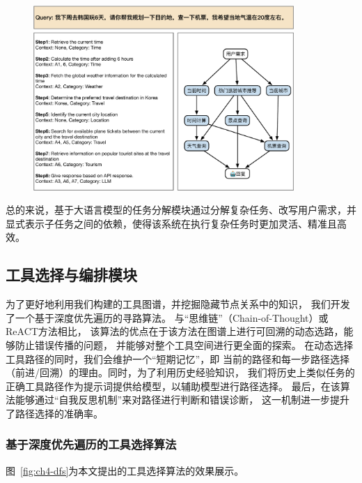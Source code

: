 \begin{figure}[!htp]
  \vspace{1em}
  \centering
  \setlength{\abovecaptionskip}{10pt} %
  \includegraphics[height=7cm]{../assets/ch4-任务分解模块.pdf}
  \label{fig:ch4-decomposition}
\end{figure}

总的来说，基于大语言模型的任务分解模块通过分解复杂任务、改写用户需求，并显式表示子任务之间的依赖，使得该系统在执行复杂任务时更加灵活、精准且高效。

\subsection{工具选择与编排模块}

为了更好地利用我们构建的工具图谱，并挖掘隐藏节点关系中的知识，
我们开发了一个基于深度优先遍历的寻路算法。
与“思维链”（Chain-of-Thought）或ReACT方法相比，
该算法的优点在于该方法在图谱上进行可回溯的动态选路，能够防止错误传播的问题，
并能够对整个工具空间进行更全面的探索。
在动态选择工具路径的同时，我们会维护一个“短期记忆”，即
当前的路径和每一步路径选择（前进/回溯）的理由。同时，为了利用历史经验知识，
我们将历史上类似任务的正确工具路径作为提示词提供给模型，以辅助模型进行路径选择。
最后，在该算法能够通过“自我反思机制”来对路径进行判断和错误诊断，
这一机制进一步提升了路径选择的准确率。

\subsubsection{基于深度优先遍历的工具选择算法}

图~\ref{fig:ch4-dfs}为本文提出的工具选择算法的效果展示。

